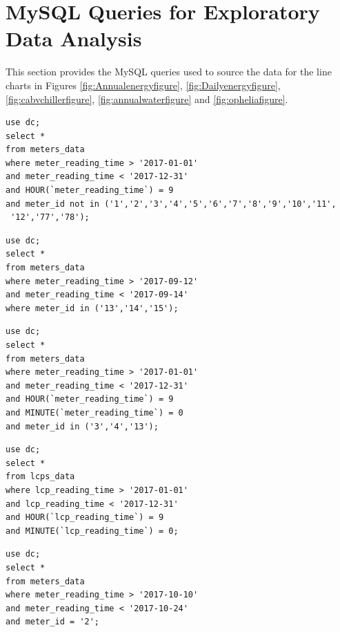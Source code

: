 \documentclass[12pt]{scrartcl}
\begin{document}
\section{MySQL Queries for Exploratory Data Analysis}
\label{sec:[MySQL Queries]}
This section provides the MySQL queries used to source the data for the line charts in Figures \ref{fig:Annualenergyfigure}, \ref{fig:Dailyenergyfigure}, \ref{fig:cabvchillerfigure}, \ref{fig:annualwaterfigure} and \ref{fig:opheliafigure}.

\begin{lstlisting}[frame=single,basicstyle=\footnotesize\ttfamily,
  caption={MySQL Query for Annual Energy Consumption},label={list:[Annual Energy Consumption]}]
use dc; 
select * 
from meters_data
where meter_reading_time > '2017-01-01'
and meter_reading_time < '2017-12-31'
and HOUR(`meter_reading_time`) = 9
and meter_id not in ('1','2','3','4','5','6','7','8','9','10','11',
 '12','77','78');
\end{lstlisting}

\begin{lstlisting}[frame=single,basicstyle=\footnotesize\ttfamily,
  caption={MySQL Query for Daily Energy Consumption},label={list:[Daily Energy Consumption]}]
use dc; 
select * 
from meters_data
where meter_reading_time > '2017-09-12'
and meter_reading_time < '2017-09-14'
where meter_id in ('13','14','15');
\end{lstlisting}

\begin{lstlisting}[frame=single,basicstyle=\footnotesize\ttfamily,
  caption={MySQL Query for Annual Energy Consumption of Chillers and Server},label={list:[Annual Energy Consumption of Chillers and Server]}]
use dc; 
select * 
from meters_data
where meter_reading_time > '2017-01-01'
and meter_reading_time < '2017-12-31'
and HOUR(`meter_reading_time`) = 9
and MINUTE(`meter_reading_time`) = 0
and meter_id in ('3','4','13');
\end{lstlisting}

\begin{lstlisting}[frame=single,basicstyle=\footnotesize\ttfamily,
  caption={MySQL Query for Annual Water Flow},label={list:[Annual Water Flow]}]
use dc; 
select * 
from lcps_data
where lcp_reading_time > '2017-01-01'
and lcp_reading_time < '2017-12-31' 
and HOUR(`lcp_reading_time`) = 9
and MINUTE(`lcp_reading_time`) = 0;
\end{lstlisting}

\begin{lstlisting}[frame=single,basicstyle=\footnotesize\ttfamily,
  caption={MySQL Query for Energy Consumption of the Generator during Storm Ophelia},label={list:[Energy Consumption of the Generator during Storm Ophelia]}]
use dc; 
select * 
from meters_data
where meter_reading_time > '2017-10-10'
and meter_reading_time < '2017-10-24'
and meter_id = '2';
\end{lstlisting}
\end{document}
